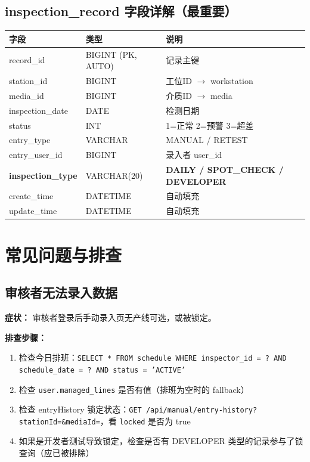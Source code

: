 \documentclass[12pt,a4paper]{ctexart}
\begin{document}
\subsection{inspection\_record 字段详解（最重要）}

\begin{table}[h]
\centering
\begin{tabular}{|l|l|l|}
\hline
\textbf{字段} & \textbf{类型} & \textbf{说明} \\
\hline
record\_id & BIGINT (PK, AUTO) & 记录主键 \\
station\_id & BIGINT & 工位ID $\rightarrow$ workstation \\
media\_id & BIGINT & 介质ID $\rightarrow$ media \\
inspection\_date & DATE & 检测日期 \\
status & INT & 1=正常 2=预警 3=超差 \\
entry\_type & VARCHAR & MANUAL / RETEST \\
entry\_user\_id & BIGINT & 录入者 user\_id \\
\textbf{inspection\_type} & VARCHAR(20) & \textbf{DAILY / SPOT\_CHECK / DEVELOPER} \\
create\_time & DATETIME & 自动填充 \\
update\_time & DATETIME & 自动填充 \\
\hline
\end{tabular}
\end{table}

\newpage
\section{常见问题与排查}

\subsection{审核者无法录入数据}

\textbf{症状：} 审核者登录后手动录入页无产线可选，或被锁定。

\textbf{排查步骤：}
\begin{enumerate}
    \item 检查今日排班：\texttt{SELECT * FROM schedule WHERE inspector\_id = ? AND schedule\_date = ? AND status = 'ACTIVE'}
    \item 检查 \texttt{user.managed\_lines} 是否有值（排班为空时的 fallback）
    \item 检查 entryHistory 锁定状态：\texttt{GET /api/manual/entry-history?stationId=\&mediaId=}，看 \texttt{locked} 是否为 true
    \item 如果是开发者测试导致锁定，检查是否有 DEVELOPER 类型的记录参与了锁查询（应已被排除）
\end{enumerate}
\end{document}
